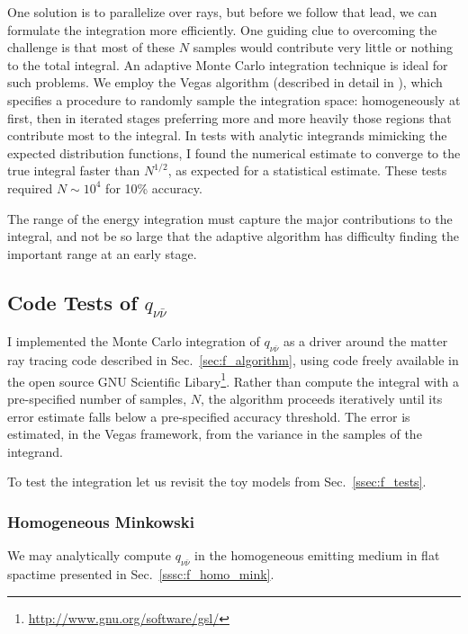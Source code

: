 One solution is to parallelize over rays, but before we follow that lead, we
can formulate the integration more efficiently.
One guiding clue to overcoming the challenge is that most of these $N$
samples would contribute very little or nothing to the total integral.
An adaptive Monte Carlo integration technique is ideal for such problems.
We employ the Vegas algorithm
(described in detail in \citealt[Sec.~7.9]{pres2007-nr_3rd_ed}),
which specifies a procedure to randomly sample the integration space:
homogeneously at first, then in iterated stages preferring more and more
heavily those regions that contribute most to the integral.
In tests with analytic integrands mimicking the expected distribution functions,
I found the numerical estimate to converge to the true integral faster than
$N^{1/2}$, as expected for a statistical estimate. These tests required
$N\sim10^4$ for 10\% accuracy.

The range of the energy integration must capture the major contributions to the
integral, and not be so large that the adaptive algorithm has difficulty
finding the important range at an early stage.

\subsection{Code Tests of $q_{\nu\bar{\nu}}$}
\label{ssec:q_tests}
I implemented the Monte Carlo integration of $q_{\nu\bar{\nu}}$ as a driver
around the matter ray tracing code described in Sec.~\ref{sec:f_algorithm},
using code freely available in the open source GNU Scientific
Libary\footnote{\url{http://www.gnu.org/software/gsl/}}.
Rather than compute the integral with a pre-specified number of samples, $N$,
the algorithm proceeds iteratively until its error estimate falls below
a pre-specified accuracy threshold.
The error is estimated, in the Vegas framework, from the variance in the
samples of the integrand. 

To test the integration let us revisit the toy models from
Sec.~\ref{ssec:f_tests}.

\subsubsection{Homogeneous Minkowski}
\label{sssc:q_homo_mink}
We may analytically compute $q_{\nu\bar{\nu}}$ in the homogeneous emitting
medium in flat spactime presented in Sec.~\ref{sssc:f_homo_mink}.

